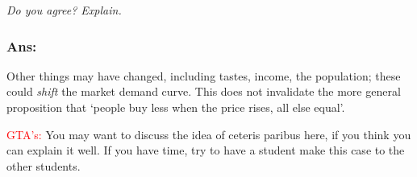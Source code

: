 \documentclass[]{article}
\begin{document}
\emph{Do you agree? Explain.}

\hypertarget{ans}{%
\subsubsection{Ans:}\label{ans}}

Other things may have changed, including tastes, income, the population;
these could \emph{shift} the market demand curve. This does not
invalidate the more general proposition that `people buy less when the
price rises, all else equal'.

\textcolor{red}{GTA's:} You may want to discuss the idea of ceteris
paribus here, if you think you can explain it well. If you have time,
try to have a student make this case to the other students.
\end{document}
